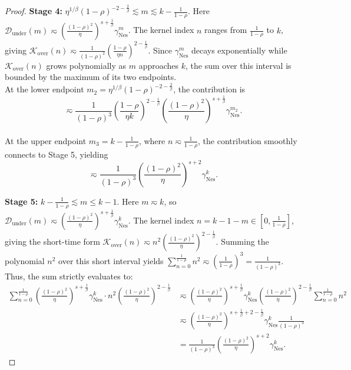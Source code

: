 \begin{proof}
\textbf{Stage 4:} $\eta^{1/\beta}(1-\rho)^{-2-\frac{2}{\beta}} \lesssim m \lesssim k - \frac{1}{1-\rho}$. 
Here $\mathcal{D}_{\mathrm{under}}(m) \eqsim \left(\frac{(1-\rho)^2}{\eta}\right)^{s+\frac{1}{\beta}} \gamma_{\mathrm{Nes}}^m$. The kernel index $n$ ranges from $\frac{1}{1-\rho}$ to $k$, giving $\mathcal{K}_{\mathrm{over}}(n) \eqsim \frac{1}{(1-\rho)^2} \left(\frac{1-\rho}{\eta n}\right)^{2-\frac{1}{\beta}}$. 
Since $\gamma_{\mathrm{Nes}}^m$ decays exponentially while $\mathcal{K}_{\mathrm{over}}(n)$ grows polynomially as $m$ approaches $k$, the sum over this interval is bounded by the maximum of its two endpoints. \\
At the lower endpoint $m_2 = \eta^{1/\beta}(1-\rho)^{-2-\frac{2}{\beta}}$, the contribution is \[\eqsim \frac{1}{(1-\rho)^3} \left(\frac{1-\rho}{\eta k}\right)^{2-\frac{1}{\beta}} \left(\frac{(1-\rho)^2}{\eta}\right)^{s+\frac{1}{\beta}} \gamma_{\mathrm{Nes}}^{m_2}.\]\\ 
At the upper endpoint $m_3 = k - \frac{1}{1-\rho}$, where $n \eqsim \frac{1}{1-\rho}$, the contribution smoothly connects to Stage 5, yielding \[\eqsim \frac{1}{(1-\rho)^3} \left(\frac{(1-\rho)^2}{\eta}\right)^{s+2} \gamma_{\mathrm{Nes}}^k.\]

\textbf{Stage 5:} $k - \frac{1}{1-\rho} \lesssim m \le k - 1$. 
Here $m \eqsim k$, so $\mathcal{D}_{\mathrm{under}}(m) \eqsim \left(\frac{(1-\rho)^2}{\eta}\right)^{s+\frac{1}{\beta}} \gamma_{\mathrm{Nes}}^k$. The kernel index $n = k-1-m \in \left[0, \frac{1}{1-\rho}\right]$, giving the short-time form $\mathcal{K}_{\mathrm{over}}(n) \eqsim n^2 \left(\frac{(1-\rho)^2}{\eta}\right)^{2-\frac{1}{\beta}}$. 
Summing the polynomial $n^2$ over this short interval yields $\sum_{n=0}^{\frac{1}{1-\rho}} n^2 \eqsim \left(\frac{1}{1-\rho}\right)^3 = \frac{1}{(1-\rho)^3}$. Thus, the sum strictly evaluates to:
\begin{align*}
    \sum_{n=0}^{\frac{1}{1-\rho}} \left(\frac{(1-\rho)^2}{\eta}\right)^{s+\frac{1}{\beta}} \gamma_{\mathrm{Nes}}^k \cdot n^2 \left(\frac{(1-\rho)^2}{\eta}\right)^{2-\frac{1}{\beta}} 
    &\eqsim \left(\frac{(1-\rho)^2}{\eta}\right)^{s+\frac{1}{\beta}} \gamma_{\mathrm{Nes}}^k \left(\frac{(1-\rho)^2}{\eta}\right)^{2-\frac{1}{\beta}} \sum_{n=0}^{\frac{1}{1-\rho}} n^2 \\
    &\eqsim \left(\frac{(1-\rho)^2}{\eta}\right)^{s+\frac{1}{\beta} + 2 - \frac{1}{\beta}} \gamma_{\mathrm{Nes}}^k \frac{1}{(1-\rho)^3} \\
    &= \frac{1}{(1-\rho)^3} \left(\frac{(1-\rho)^2}{\eta}\right)^{s+2} \gamma_{\mathrm{Nes}}^k.
\end{align*}


\end{proof}
